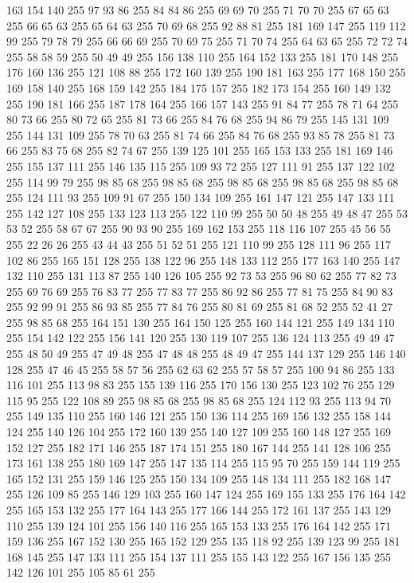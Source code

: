 163 154 140 255 97 93 86 255 84 84 86 255 69 69 70 255 71 70 70 255 67 65 63 255 66 65 63 255 65 64 63 255 70 69 68 255 92 88 81 255 181 169 147 255 119 112 99 255 79 78 79 255 66 66 69 255 70 69 75 255 71 70 74 255 64 63 65 255 72 72 74 255 58 58 59 255 50 49 49 255 156 138 110 255 164 152 133 255 181 170 148 255 176 160 136 255 121 108 88 255 172 160 139 255 190 181 163 255 177 168 150 255 169 158 140 255 168 159 142 255 184 175 157 255 182 173 154 255 160 149 132 255 190 181 166 255 187 178 164 255 166 157 143 255 91 84 77 255 78 71 64 255 80 73 66 255 80 72 65 255 81 73 66 255 84 76 68 255 94 86 79 255 145 131 109 255 144 131 109 255 78 70 63 255 81 74 66 255 84 76 68 255 93 85 78 255 81 73 66 255 83 75 68 255 82 74 67 255 139 125 101 255 165 153 133 255 181 169 146 255 155 137 111 255 146 135 115 255 109 93 72 255 127 111 91 255 137 122 102 255 114 99 79 255 98 85 68 255 98 85 68 255 98 85 68 255
98 85 68 255 98 85 68 255 124 111 93 255 109 91 67 255 150 134 109 255 161 147 121 255 147 133 111 255 142 127 108 255 133 123 113 255 122 110 99 255 50 50 48 255 49 48 47 255 53 53 52 255 58 67 67 255 90 93 90 255 169 162 153 255 118 116 107 255 45 56 55 255 22 26 26 255 43 44 43 255 51 52 51 255 121 110 99 255 128 111 96 255 117 102 86 255 165 151 128 255 138 122 96 255 148 133 112 255 177 163 140 255 147 132 110 255 131 113 87 255 140 126 105 255 92 73 53 255 96 80 62 255 77 82 73 255 69 76 69 255 76 83 77 255 77 83 77 255 86 92 86 255 77 81 75 255 84 90 83 255 92 99 91 255 86 93 85 255 77 84 76 255 80 81 69 255 81 68 52 255 52 41 27 255 98 85 68 255 164 151 130 255 164 150 125 255 160 144 121 255 149 134 110 255 154 142 122 255 156 141 120 255 130 119 107 255 136 124 113 255 49 49 47 255 48 50 49 255 47 49 48 255 47 48 48 255 48 49 47 255 144 137 129 255 146 140 128 255 47 46 45 255 58 57 56 255
62 63 62 255 57 58 57 255 100 94 86 255 133 116 101 255 113 98 83 255 155 139 116 255 170 156 130 255 123 102 76 255 129 115 95 255 122 108 89 255 98 85 68 255 98 85 68 255 124 112 93 255 113 94 70 255 149 135 110 255 160 146 121 255 150 136 114 255 169 156 132 255 158 144 124 255 140 126 104 255 172 160 139 255 140 127 109 255 160 148 127 255 169 152 127 255 182 171 146 255 187 174 151 255 180 167 144 255 141 128 106 255 173 161 138 255 180 169 147 255 147 135 114 255 115 95 70 255 159 144 119 255 165 152 131 255 159 146 125 255 150 134 109 255 148 134 111 255 182 168 147 255 126 109 85 255 146 129 103 255 160 147 124 255 169 155 133 255 176 164 142 255 165 153 132 255 177 164 143 255 177 166 144 255 172 161 137 255 143 129 110 255 139 124 101 255 156 140 116 255 165 153 133 255 176 164 142 255 171 159 136 255 167 152 130 255 165 152 129 255 135 118 92 255 139 123 99 255 181 168 145 255 147 133 111 255 154 137 111 255 155 143 122 255 167 156 135 255 142 126 101 255 105 85 61 255
